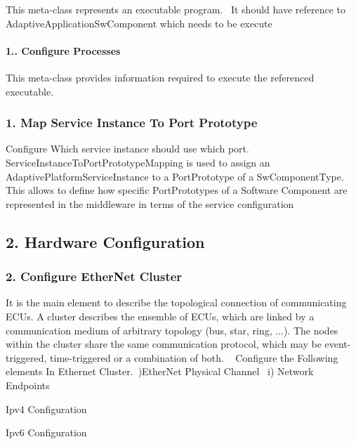 This meta-\/class represents an executable program.~\newline
 It should have reference to Adaptive\+Application\+Sw\+Component which needs to be execute

 \paragraph*{1.. Configure Processes}

This meta-\/class provides information required to execute the referenced executable.

 \subsubsection*{1. Map Service Instance To Port Prototype}

Configure Which service instance should use which port. Service\+Instance\+To\+Port\+Prototype\+Mapping is used to assign an Adaptive\+Platform\+Service\+Instance to a Port\+Prototype of a Sw\+Component\+Type. This allows to define how specific Port\+Prototypes of a Software Component are represented in the middleware in terms of the service configuration

 \subsection*{2. Hardware Configuration}

\subsubsection*{2. Configure Ether\+Net Cluster}

It is the main element to describe the topological connection of communicating E\+C\+Us. A cluster describes the ensemble of E\+C\+Us, which are linked by a communication medium of arbitrary topology (bus, star, ring, ...). The nodes within the cluster share the same communication protocol, which may be event-\/triggered, time-\/triggered or a combination of both. ~\newline
 Configure the Following elements In Ethernet Cluster.~)Ether\+Net Physical Channel~\newline
 i) Network Endpoints
\begin{DoxyItemize}
\item Ipv4 Configuration
\item Ipv6 Configuration
\end{DoxyItemize}

